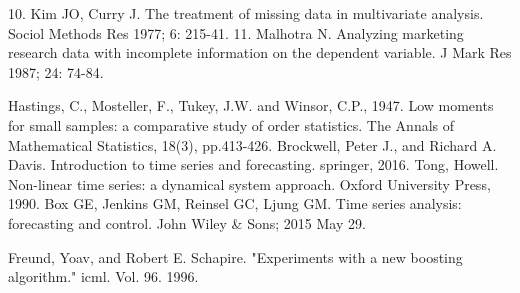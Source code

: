 \documentclass[11pt]{report}           %
\begin{document}
\begin{thebibliography}{80}
 \bibitem{}
10. Kim JO, Curry J. The treatment of missing data in multivariate
analysis. Sociol Methods Res 1977; 6: 215-41.
11. Malhotra N. Analyzing marketing research data with incomplete information on the dependent variable. J Mark Res 1987; 24: 74-84.
 
 Hastings, C., Mosteller, F., Tukey, J.W. and Winsor, C.P., 1947. Low moments for small samples: a comparative study of order statistics. The Annals of Mathematical Statistics, 18(3), pp.413-426.
 Brockwell, Peter J., and Richard A. Davis. Introduction to time series and forecasting. springer, 2016.
 Tong, Howell. Non-linear time series: a dynamical system approach. Oxford University Press, 1990.
 Box GE, Jenkins GM, Reinsel GC, Ljung GM. Time series analysis: forecasting and control. John Wiley & Sons; 2015 May 29.
 
 Freund, Yoav, and Robert E. Schapire. "Experiments with a new boosting algorithm." icml. Vol. 96. 1996.
 
 
 
 
\end{thebibliography}
\end{document}
